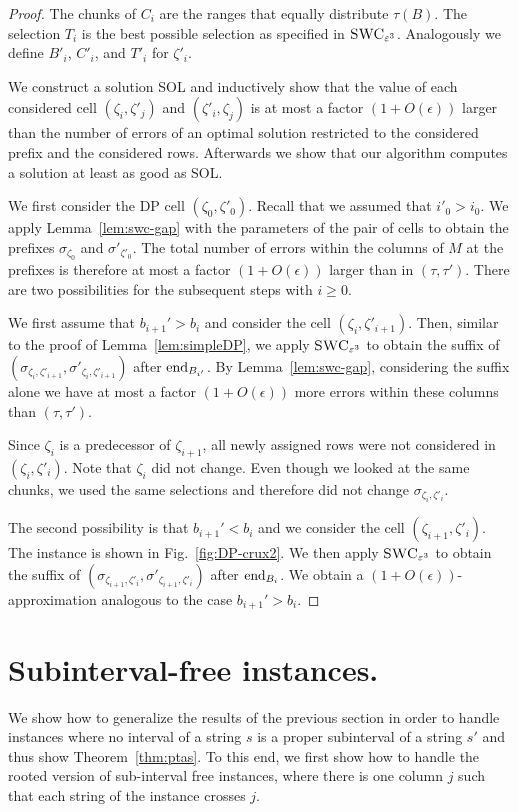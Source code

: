 \begin{proof}
    The chunks of $C_i$ are the ranges that equally distribute $\tau(B)$. The selection $T_i$ is the best possible selection as specified in $\textsc{SWC}_{\varepsilon^3}$.
    Analogously we define $B'_i$, $C'_i$, and $T'_i$ for $\zeta'_i$.

    We construct a solution SOL and inductively show that the value of each considered cell $(\zeta_i,\zeta'_j)$ and $(\zeta'_i,\zeta_j)$ is at most a factor $(1+O(\epsilon))$ larger than the number of errors of an optimal solution restricted to the considered prefix and the considered rows. 
    Afterwards we show that our algorithm computes a solution at least as good as SOL.

    We first consider the DP cell $(\zeta_0,\zeta'_0)$.
    Recall that we assumed \WLOG that $i'_0 > i_0$.
    We apply Lemma~\ref{lem:swc-gap} with the parameters of the pair of cells to obtain the prefixes $\sigma_{\zeta_0}$ and $\sigma'_{\zeta'_0}$.
    The total number of errors within the columns of $M$ at the prefixes is therefore at most a factor $(1+O(\epsilon))$ larger than in $(\tau,\tau')$.
    There are two possibilities for the subsequent steps with $i \ge 0$.

    We first assume that $b_{i+1}' > b_{i}$ and consider the cell $(\zeta_{i},\zeta'_{i+1})$.
    Then, similar to the proof of Lemma~\ref{lem:simpleDP}, we apply $\textsc{SWC}_{\varepsilon^3}$ to obtain the suffix of $({\sigma}_{\zeta_i,\zeta'_{i+1}},{\sigma'}_{\zeta_i,\zeta'_{i+1}})$ after $\textrm{end}_{B_{i'}}$.
    By Lemma~\ref{lem:swc-gap}, considering the suffix alone we have at most a factor $(1+O(\epsilon))$ more errors within these columns than $(\tau,\tau')$.

    Since $\zeta_i$ is a predecessor of $\zeta_{i+1}$, all newly assigned rows were not considered in $(\zeta_i,\zeta'_i)$.
    Note that $\zeta_i$ did not change. Even though we looked at the same chunks, we used the same selections and therefore did not change $\sigma_{\zeta_i,\zeta'_i}$.

    The second possibility is that $b_{i+1}' < b_{i}$ and we consider the cell $(\zeta_{i+1},\zeta'_{i})$. The instance is shown in Fig.~\ref{fig:DP-crux2}.
    We then apply $\textsc{SWC}_{\varepsilon^3}$ to obtain the suffix of $({\sigma}_{\zeta_{i+1},\zeta'_{i}},{\sigma'}_{\zeta_{i+1},\zeta'_{i}})$ after $\textrm{end}_{B_{i}}$.
    We obtain a $(1+O(\epsilon))$-approximation analogous to the case $b_{i+1}' > b_{i}$.
\end{proof}

\section{Subinterval-free instances.}\label{sec:subinterval-free}
We show how to generalize the results of the previous section in order to handle instances where no interval of a string $s$ is a proper subinterval of a string $s'$ and thus show Theorem~\ref{thm:ptas}.
To this end, we first show how to handle the rooted version of sub-interval free instances, where there is one column $j$ such that each string of the instance crosses $j$.

